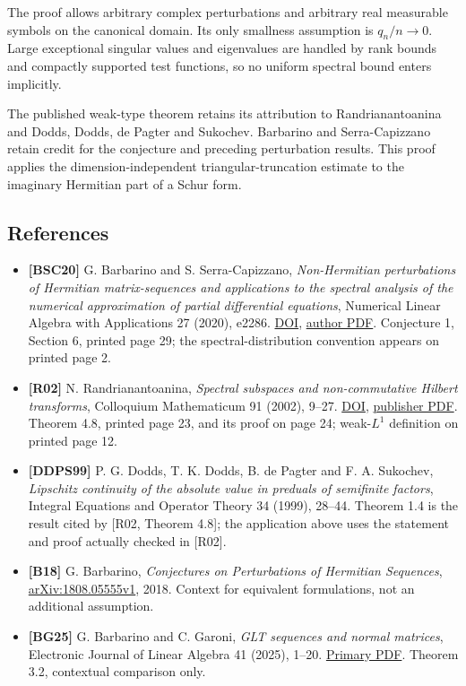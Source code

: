 \documentclass[10pt,a4paper]{article}
\providecommand{\tightlist}{\setlength{\itemsep}{0pt}\setlength{\parskip}{0pt}}
\begin{document}
The proof allows arbitrary complex perturbations and arbitrary real
measurable symbols on the canonical domain. Its only smallness
assumption is \(q_n/n\to0\). Large exceptional singular values and
eigenvalues are handled by rank bounds and compactly supported test
functions, so no uniform spectral bound enters implicitly.

The published weak-type theorem retains its attribution to
Randrianantoanina and Dodds, Dodds, de Pagter and Sukochev. Barbarino
and Serra-Capizzano retain credit for the conjecture and preceding
perturbation results. This proof applies the dimension-independent
triangular-truncation estimate to the imaginary Hermitian part of a
Schur form.

\newpage

\subsection{References}\label{references}

\begin{itemize}
\tightlist
\item
  \textbf{{[}BSC20{]}} G. Barbarino and S. Serra-Capizzano,
  \emph{Non-Hermitian perturbations of Hermitian matrix-sequences and
  applications to the spectral analysis of the numerical approximation
  of partial differential equations}, Numerical Linear Algebra with
  Applications 27 (2020), e2286.
  \href{https://doi.org/10.1002/nla.2286}{DOI},
  \href{https://giovannibarbarino.github.io/doc/articles/NHperturbation.pdf}{author
  PDF}. Conjecture 1, Section 6, printed page 29; the
  spectral-distribution convention appears on printed page 2.
\item
  \textbf{{[}R02{]}} N. Randrianantoanina, \emph{Spectral subspaces and
  non-commutative Hilbert transforms}, Colloquium Mathematicum 91
  (2002), 9--27. \href{https://doi.org/10.4064/cm91-1-2}{DOI},
  \href{https://www.impan.pl/shop/en/publication/transaction/download/product/87479}{publisher
  PDF}. Theorem 4.8, printed page 23, and its proof on page 24;
  weak-\(L^1\) definition on printed page 12.
\item
  \textbf{{[}DDPS99{]}} P. G. Dodds, T. K. Dodds, B. de Pagter and F. A.
  Sukochev, \emph{Lipschitz continuity of the absolute value in preduals
  of semifinite factors}, Integral Equations and Operator Theory 34
  (1999), 28--44. Theorem 1.4 is the result cited by {[}R02, Theorem
  4.8{]}; the application above uses the statement and proof actually
  checked in {[}R02{]}.
\item
  \textbf{{[}B18{]}} G. Barbarino, \emph{Conjectures on Perturbations of
  Hermitian Sequences},
  \href{https://arxiv.org/abs/1808.05555v1}{arXiv:1808.05555v1}, 2018.
  Context for equivalent formulations, not an additional assumption.
\item
  \textbf{{[}BG25{]}} G. Barbarino and C. Garoni, \emph{GLT sequences
  and normal matrices}, Electronic Journal of Linear Algebra 41 (2025),
  1--20.
  \href{https://journals.uwyo.edu/index.php/ela/article/download/8929/6949/23285}{Primary
  PDF}. Theorem 3.2, contextual comparison only.
\end{itemize}
\end{document}

